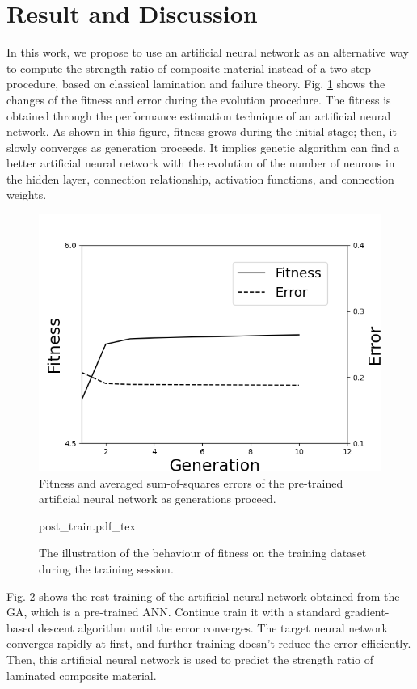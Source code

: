 \section{Result and Discussion}

In this work, we propose to use an artificial neural network as an alternative
way to compute the strength ratio of composite material instead of a two-step
procedure, based on classical lamination and failure theory.
Fig. \ref{fig:ga_nn} shows the changes of the fitness and error during the
evolution procedure. The fitness is obtained through the performance estimation
technique of an artificial neural network. As shown in this figure, fitness
grows during the initial stage; then, it slowly converges as generation
proceeds. It implies genetic algorithm can find a better artificial neural
network with the evolution of the number of neurons in the hidden layer,
connection relationship, activation functions, and connection weights.

\begin{figure}[!tb]
	\includegraphics[width=0.9\linewidth]{./fig/result_ga_ann.png}
	\caption{Fitness and averaged sum-of-squares errors of the pre-trained artificial neural network as generations proceed.}
	\label{fig:ga_nn}
\end{figure}

\begin{figure}[!tb]
	\centering
	\def\svgwidth{\columnwidth}
	{post_train.pdf_tex}
	\caption{The illustration of the behaviour of fitness on the training dataset during the training session.}
	\label{fig:final_train}
\end{figure}


Fig. \ref{fig:final_train} shows the rest training of the artificial neural
network obtained from the GA, which is a pre-trained ANN. Continue train it with
a standard gradient-based descent algorithm until the error converges.
The target neural network converges rapidly at first, and further training
doesn’t reduce the error efficiently. Then, this artificial neural network is
used to predict the strength ratio of laminated composite material.

